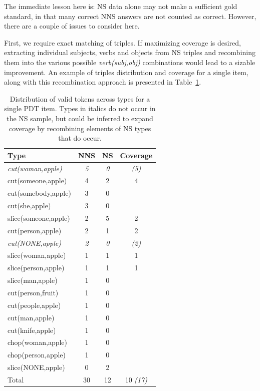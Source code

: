 The immediate lesson here is: NS data alone may not make a sufficient
gold standard, in that many correct NNS answers are not counted as
correct.  However, there are a couple of issues to consider here.

First, we require exact matching of triples.  If maximizing coverage
is desired, extracting individual subjects, verbs and objects from NS
triples and recombining them into the various possible
\textit{verb(subj,obj)} combinations would lead to a sizable
improvement. An example of triples distribution and coverage for a
single item, along with this recombination approach is presented in
Table~\ref{tab:item8types}.
\begin{table}[htb!]
\begin{center}
\begin{tabular}{|l|c|c|c|}
  \hline
  Type & NNS & NS & Coverage \\
  \hline
  \hline
\textit{cut(woman,apple)} & \textit{5} & \textit{0} & \textit{(5)} \\
 \hline
 cut(someone,apple) & 4 & 2 & 4 \\
 \hline
 cut(somebody,apple) & 3 & 0 & \\
 \hline
 cut(she,apple) & 3 & 0 & \\
 \hline
 slice(someone,apple) & 2 & 5 & 2 \\
 \hline
 cut(person,apple) & 2 & 1 & 2\\
 \hline
 \textit{cut(NONE,apple)} & \textit{2} & \textit{0} & \textit{(2)} \\
 \hline
 slice(woman,apple) & 1 & 1 & 1 \\
 \hline
 slice(person,apple) & 1 & 1 & 1 \\
 \hline
 slice(man,apple) & 1 & 0 & \\
 \hline
 cut(person,fruit) & 1 & 0 & \\
 \hline
 cut(people,apple) & 1 & 0 & \\
 \hline
 cut(man,apple) & 1 & 0 & \\
 \hline
 cut(knife,apple) & 1 & 0 & \\
 \hline
 chop(woman,apple) & 1 & 0 & \\
 \hline
 chop(person,apple) & 1 & 0 & \\
 \hline
 slice(NONE,apple) & 0 & 2 & \\
 \hline
 Total  &  30 & 12 & 10 \textit{(17)} \\
 \hline
\end{tabular}
\end{center}
\caption{Distribution of valid tokens across types for a single PDT item. Types in italics do not occur in the NS sample, but could be inferred to expand coverage by recombining elements of NS types that do occur.}
\label{tab:item8types}
\end{table}

